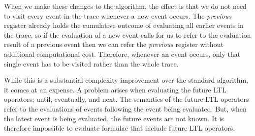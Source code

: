 When we make these changes to the algorithm, the effect is that we do not need to visit every event in the trace whenever a new event occurs.  The \textit{previous} register already holds the cumulative outcome of evaluating all earlier events in the trace, so if the evaluation of a new event calls for us to refer to the evaluation result of a previous event then we can refer the \textit{previous} register without additional computational cost.  Therefore, whenever an event occurs, only that single event has to be visited rather than the whole trace.

While this is a substantial complexity improvement over the standard algorithm, it comes at an expense.  A problem arises when evaluating the future LTL operators; until, eventually, and next.  The semantics of the future LTL operators refer to the evaluations of events following the event being evaluated.  But, when the latest event is being evaluated, the future events are not known.  It is therefore impossible to evaluate formulae that include future LTL operators.

